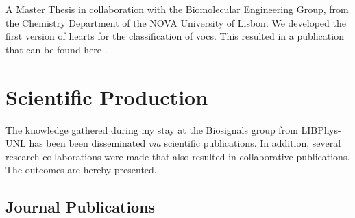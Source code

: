 A Master Thesis in collaboration with the Biomolecular Engineering Group, from the Chemistry Department of the NOVA University of Lisbon. We developed the first version of \gls{hearts} for the classification of \gls{voc}s. This resulted in a publication that can be found here \cite{class_voc}.

\section{Scientific Production}

The knowledge gathered during my stay at the Biosignals group from LIBPhys-UNL has been been disseminated \textit{via} scientific publications. In addition, several research collaborations were made that also resulted in collaborative publications. The outcomes are hereby presented.

\subsection{Journal Publications}

